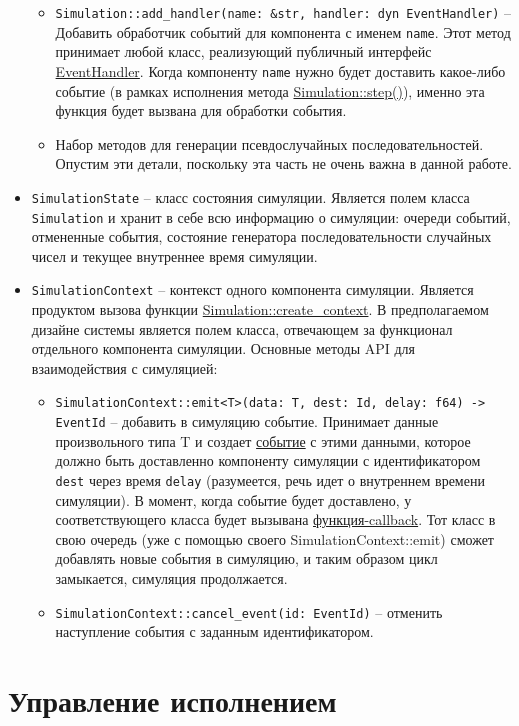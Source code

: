 \begin{itemize}
\begin{itemize}
        \item \texttt{Simulation::add\_handler(name: \&str, handler: dyn EventHandler)} -- Добавить обработчик событий для компонента с именем \texttt{name}.
        Этот метод принимает любой класс, реализующий публичный интерфейс \hyperref[EventHandler]{EventHandler}. Когда компоненту \texttt{name} нужно будет доставить какое-либо событие (в рамках исполнения метода \hyperref[Simulation::step]{Simulation::step()}), именно эта функция будет вызвана для обработки события.
        \item Набор методов для генерации псевдослучайных последовательностей. Опустим эти детали, поскольку эта часть не очень важна в данной работе.
    \end{itemize}
    \item \texttt{SimulationState} -- класс состояния симуляции. Является полем класса \texttt{Simulation} и хранит в себе всю информацию о симуляции: очереди событий, отмененные события, состояние генератора последовательности случайных чисел и текущее внутреннее время симуляции.
    \item \texttt{SimulationContext} -- контекст одного компонента симуляции. Является продуктом вызова функции \hyperref[Simulation::createcontext]{Simulation::create\_context}. В предполагаемом дизайне системы является полем класса, отвечающем за функционал отдельного компонента симуляции. Основные методы API для взаимодействия с симуляцией:
    \begin{itemize}
        \item \texttt{SimulationContext::emit<T>(data: T, dest: Id, delay: f64) -> EventId} -- добавить в симуляцию событие. Принимает данные произвольного типа T и создает \hyperref[Event]{событие} с этими данными, которое должно быть доставленно компоненту симуляции с идентификатором \texttt{dest} через время \texttt{delay} (разумеется, речь идет о внутреннем времени симуляции). В момент, когда событие будет доставлено, у соответствующего класса будет вызывана \hyperref[fnon]{функция-callback}. Тот класс в свою очередь (уже с помощью своего SimulationContext::emit) сможет добавлять новые события в симуляцию, и таким образом цикл замыкается, симуляция продолжается.
        \item \texttt{SimulationContext::cancel\_event(id: EventId)} -- отменить наступление события с заданным идентификатором. \label{SimulationContext} 
    \end{itemize}
\end{itemize}


\section{Управление исполнением}

